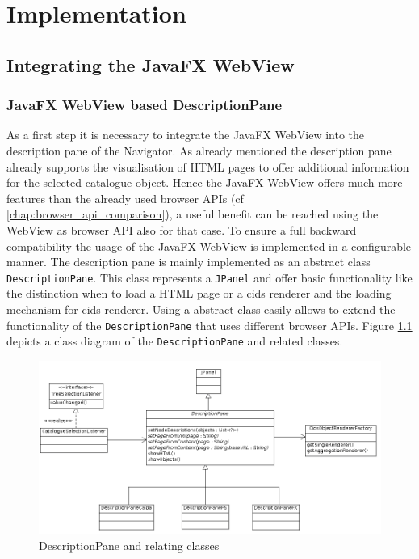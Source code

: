 \chapter{Implementation}\label{chap:implementation}

\section{Integrating the JavaFX WebView}

\subsection{JavaFX WebView based DescriptionPane}

As a first step it is necessary to integrate the JavaFX WebView into the description pane of the Navigator.
As already mentioned the description pane already supports the visualisation of HTML pages to offer additional information for the selected catalogue object. 
Hence the JavaFX WebView offers much more features than the already used browser APIs (cf \ref{chap:browser_api_comparison}), a useful benefit can be reached using the WebView as browser API also for that case. 
To ensure a full backward compatibility the usage of the JavaFX WebView is implemented in a configurable manner. 
The description pane is mainly implemented as an abstract class \texttt{DescriptionPane}. 
This class represents a \texttt{JPanel} and offer basic functionality like the distinction when to load a HTML page or a cids renderer and the loading mechanism for cids renderer. 
Using a abstract class easily allows to extend the functionality of the \texttt{DescriptionPane} that uses different browser APIs.  
Figure \ref{fig:class_diag_desc_pane} depicts a class diagram of the \texttt{DescriptionPane} and related classes.

\begin{figure}
	\centering	\includegraphics[width=1.0\textwidth]{./img/classDiagramms/description_pane.png}
	\caption{DescriptionPane and relating classes}
	\label{fig:class_diag_desc_pane}
\end{figure}

